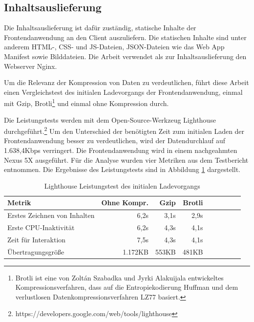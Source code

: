 \subsection{Inhaltsauslieferung}
\label{subsec:inhaltsauslieferung}
Die Inhaltsauslieferung ist dafür zuständig, statische Inhalte der Frontendanwendung
an den Client auszuliefern. Die statischen Inhalte sind unter anderem
HTML-, CSS- und JS-Dateien, JSON-Dateien wie das Web App Manifest sowie Bilddateien.
Die Arbeit verwendet als zur Inhaltsauslieferung den Webserver Nginx.

Um die Relevanz der Kompression von Daten zu verdeutlichen, führt diese Arbeit einen
Vergleichstest des initialen Ladevorgangs der Frontendanwendung,
einmal mit Gzip, Brotli\footnote{Brotli ist eine von Zoltán Szabadka
und Jyrki Alakuijala entwickeltes Kompressionsverfahren,
dass auf die Entropiekodierung Huffman und dem verlustlosen
Datenkompressionsverfahren LZ77 basiert.\cite{BrotliGoogleOpenSourceBlog}} und einmal ohne Kompression durch. 

Die Leistungstests werden mit dem Open-Source-Werkzeug Lighthouse durchgeführt.\footnote{https://developers.google.com/web/tools/lighthouse}
Um den Unterschied der benötigten Zeit zum initialen Laden der Frontendanwendung
besser zu verdeutlichen, wird der Datendurchlauf auf 1.638,4Kbps verringert.
Die Frontendanwendung wird in einem nachgeahmten Nexus 5X ausgeführt.
Für die Analyse wurden vier Metriken aus dem Testbericht entnommen.
Die Ergebnisse des Leistungstests sind in Abbildung \ref{tab:lighthouseleistungstestdesinitialenladevorgangs}
dargestellt.

\begin{table}[h]
\begin{center}
\begin{tabular}{l*{8}{r}}
Metrik & Ohne Kompr. & Gzip & Brotli \\
\hline
Erstes Zeichnen von Inhalten & 6,2s  & 3,1s & 2,9s \\
Erste CPU-Inaktivität        & 6,2s  & 4,3s & 4,1s \\
Zeit für Interaktion         & 7,5s  & 4,3s & 4,1s \\
Übertragungsgröße            & 1.172KB  &  553KB & 481KB \\
\end{tabular}
\end{center}
\caption{Lighthouse Leistungstest des initialen Ladevorgangs}
\label{tab:lighthouseleistungstestdesinitialenladevorgangs}
\end{table}

